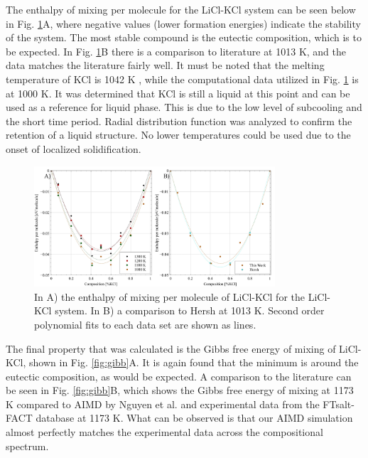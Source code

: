 \documentclass[review]{elsarticle}
\begin{document}
\FloatBarrier

The enthalpy of mixing per molecule for the LiCl-KCl system can be seen below in Fig. \ref{fig:enthalpy}A, where negative values (lower formation energies) indicate the stability of the system. The most stable compound is the eutectic composition, which is to be expected. In Fig. \ref{fig:enthalpy}B there is a comparison to literature \cite{hersh1965enthalpies} at 1013 K, and the data matches the literature fairly well. It must be noted that the melting temperature of KCl is 1042 K \cite{Zhou2020}, while the computational data utilized in Fig. \ref{fig:enthalpy} is at 1000 K. It was determined that KCl is still a liquid at this point and can be used as a reference for liquid phase. This is due to the low level of subcooling and the short time period. Radial distribution function was analyzed to confirm the retention of a liquid structure. No lower temperatures could be used due to the onset of localized solidification.

\begin{figure}[h]
 \centering
 \includegraphics[width=0.8\textwidth]{images/enthalpy_combined.jpg} 
 \caption{In A) the enthalpy of mixing per molecule of LiCl-KCl for the LiCl-KCl system. In B)  a comparison to Hersh \cite{hersh1965enthalpies} at 1013 K. Second order polynomial fits to each data set are shown as lines.}
 \label{fig:enthalpy}
\end{figure} 

The final property that was calculated is the Gibbs free energy of mixing of LiCl-KCl, shown in Fig. \ref{fig:gibb}A. It is again found that the minimum is around the eutectic composition, as would be expected. A comparison to the literature can be seen in Fig. \ref{fig:gibb}B, which shows the Gibbs free energy of mixing at 1173 K compared to AIMD by Nguyen et al. \cite{NGUYEN2021} and experimental data from the FTsalt-FACT database \cite{FTsalt} at 1173 K. What can be observed is that our AIMD simulation almost perfectly matches the experimental data across the compositional spectrum.
\end{document}
